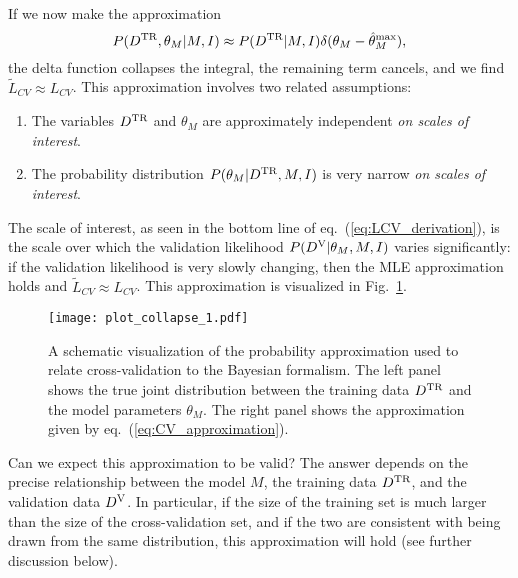 \documentclass[12pt]{article}
\newcommand{\Dtr}{\ensuremath{D^{\rm TR}}}
\newcommand{\Dva}{\ensuremath{D^{\rm V}}}
\newcommand{\eqn}[1]{eq.~(\ref{eq:#1})}
\newcommand{\fig}[1]{Fig.~\ref{fig:#1}}
\begin{document}
If we now make the approximation
\begin{equation}
  \label{eq:CV_approximation}
  P(\Dtr,\theta_M|M,I) \approx P(\Dtr|M, I)
                               \delta(\theta_M - \hat{\theta}^{\max}_M),
\end{equation}
the delta function collapses the integral, the remaining term cancels,
and we find $\widetilde{L}_{CV} \approx {L}_{CV}$.  This approximation
involves two related assumptions:
\begin{enumerate}
  \item The variables \Dtr{} and $\theta_M$ are approximately independent
    {\it on scales of interest}.
  \item The probability distribution $P(\theta_M|\Dtr, M, I)$ is very narrow
    {\it on scales of interest}.
\end{enumerate}
The scale of interest, as seen in the bottom line of \eqn{LCV_derivation},
is the scale over which the validation likelihood $P(\Dva|\theta_M, M, I)$
varies significantly: if the validation likelihood is very slowly changing,
then the MLE approximation holds and $\widetilde{L}_{CV} \approx {L}_{CV}$.
This approximation is visualized in \fig{approx_vis}.

\begin{figure}
  \centering
  \texttt{[image: plot\_collapse\_1.pdf]}
  \caption{A schematic visualization of the probability approximation used to
    relate cross-validation to the Bayesian formalism.  The left panel shows
    the true joint distribution between the training data \Dtr{} and the
    model parameters $\theta_M$.  The right panel shows the approximation
    given by \eqn{CV_approximation}.}
  \label{fig:approx_vis}
\end{figure}

Can we expect this approximation to be valid?  The answer depends on the
precise relationship between the model $M$, the training data \Dtr, and
the validation data \Dva{}.  In particular, if the size of the training set
is much larger than the size of the cross-validation set, and if the two
are consistent with being drawn from the same distribution, this approximation
will hold (see further discussion below).
\end{document}
